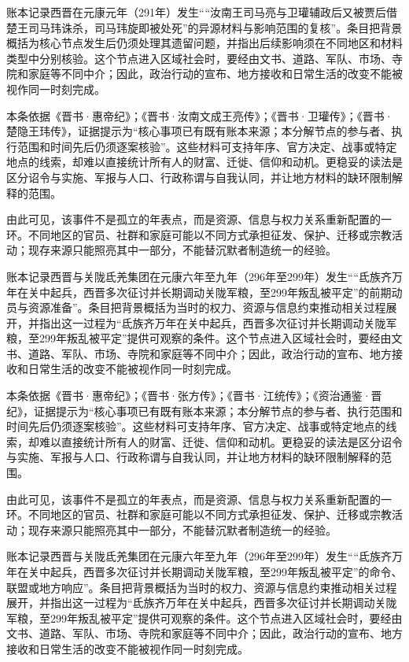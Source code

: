账本记录西晋在元康元年（291年）发生““汝南王司马亮与卫瓘辅政后又被贾后借楚王司马玮诛杀，司马玮旋即被处死”的异源材料与影响范围的复核”。条目把背景概括为核心节点发生后仍须处理其遗留问题，并指出后续影响须在不同地区和材料类型中分别核验。这个节点进入区域社会时，要经由文书、道路、军队、市场、寺院和家庭等不同中介；因此，政治行动的宣布、地方接收和日常生活的改变不能被视作同一时刻完成。

本条依据《晋书·惠帝纪》；《晋书·汝南文成王亮传》；《晋书·卫瓘传》；《晋书·楚隐王玮传》，证据提示为“核心事项已有既有账本来源；本分解节点的参与者、执行范围和时间先后仍须逐案核验”。这些材料可支持年序、官方决定、战事或特定地点的线索，却难以直接统计所有人的财富、迁徙、信仰和动机。更稳妥的读法是区分诏令与实施、军报与人口、行政称谓与自我认同，并让地方材料的缺环限制解释的范围。

由此可见，该事件不是孤立的年表点，而是资源、信息与权力关系重新配置的一环。不同地区的官员、社群和家庭可能以不同方式承担征发、保护、迁移或宗教活动；现存来源只能照亮其中一部分，不能替沉默者制造统一的经验。

账本记录西晋与关陇氐羌集团在元康六年至九年（296年至299年）发生““氐族齐万年在关中起兵，西晋多次征讨并长期调动关陇军粮，至299年叛乱被平定”的前期动员与资源准备”。条目把背景概括为当时的权力、资源与信息约束推动相关过程展开，并指出这一过程为“氐族齐万年在关中起兵，西晋多次征讨并长期调动关陇军粮，至299年叛乱被平定”提供可观察的条件。这个节点进入区域社会时，要经由文书、道路、军队、市场、寺院和家庭等不同中介；因此，政治行动的宣布、地方接收和日常生活的改变不能被视作同一时刻完成。

本条依据《晋书·惠帝纪》；《晋书·张方传》；《晋书·江统传》；《资治通鉴·晋纪》，证据提示为“核心事项已有既有账本来源；本分解节点的参与者、执行范围和时间先后仍须逐案核验”。这些材料可支持年序、官方决定、战事或特定地点的线索，却难以直接统计所有人的财富、迁徙、信仰和动机。更稳妥的读法是区分诏令与实施、军报与人口、行政称谓与自我认同，并让地方材料的缺环限制解释的范围。

由此可见，该事件不是孤立的年表点，而是资源、信息与权力关系重新配置的一环。不同地区的官员、社群和家庭可能以不同方式承担征发、保护、迁移或宗教活动；现存来源只能照亮其中一部分，不能替沉默者制造统一的经验。

账本记录西晋与关陇氐羌集团在元康六年至九年（296年至299年）发生““氐族齐万年在关中起兵，西晋多次征讨并长期调动关陇军粮，至299年叛乱被平定”的命令、联盟或地方响应”。条目把背景概括为当时的权力、资源与信息约束推动相关过程展开，并指出这一过程为“氐族齐万年在关中起兵，西晋多次征讨并长期调动关陇军粮，至299年叛乱被平定”提供可观察的条件。这个节点进入区域社会时，要经由文书、道路、军队、市场、寺院和家庭等不同中介；因此，政治行动的宣布、地方接收和日常生活的改变不能被视作同一时刻完成。

